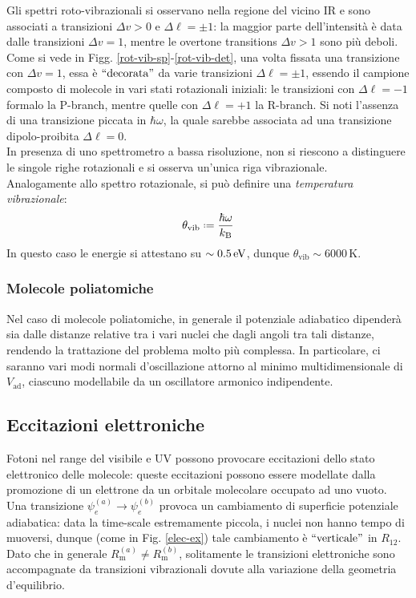 Gli spettri roto-vibrazionali si osservano nella regione del vicino IR e sono associati a transizioni $ \Delta v > 0 $ e $ \Delta \ell = \pm 1 $: la maggior parte dell'intensità è data dalle transizioni $ \Delta v = 1 $, mentre le overtone transitions $ \Delta v > 1 $ sono più deboli. \\
Come si vede in Figg. \ref{rot-vib-sp}-\ref{rot-vib-det}, una volta fissata una transizione con $ \Delta v = 1 $, essa è $ ``\text{decorata}" $ da varie transizioni $ \Delta \ell = \pm 1 $, essendo il campione composto di molecole in vari stati rotazionali iniziali: le transizioni con $ \Delta \ell = -1 $ formalo la P-branch, mentre quelle con $ \Delta \ell = +1 $ la R-branch. Si noti l'assenza di una transizione piccata in $ \hbar \omega $, la quale sarebbe associata ad una transizione dipolo-proibita $ \Delta \ell = 0 $. \\
In presenza di uno spettrometro a bassa risoluzione, non si riescono a distinguere le singole righe rotazionali e si osserva un'unica riga vibrazionale. \\
Analogamente allo spettro rotazionale, si può definire una \textit{temperatura vibrazionale}:
\begin{equation}
	\theta_\text{vib} \defeq \frac{\hbar \omega}{k_\text{B}}
\end{equation}
In questo caso le energie si attestano su $ \sim 0.5\,\mathrm{eV} $, dunque $ \theta_\text{vib} \sim 6000 \,\text{K} $.

\subsubsection{Molecole poliatomiche}

Nel caso di molecole poliatomiche, in generale il potenziale adiabatico dipenderà sia dalle distanze relative tra i vari nuclei che dagli angoli tra tali distanze, rendendo la trattazione del problema molto più complessa. In particolare, ci saranno vari modi normali d'oscillazione attorno al minimo multidimensionale di $ V_\text{ad} $, ciascuno modellabile da un oscillatore armonico indipendente.

\subsection{Eccitazioni elettroniche}

Fotoni nel range del visibile e UV possono provocare eccitazioni dello stato elettronico delle molecole: queste eccitazioni possono essere modellate dalla promozione di un elettrone da un orbitale molecolare occupato ad uno vuoto. Una transizione $ \psi_e^{(a)} \rightarrow \psi_e^{(b)} $ provoca un cambiamento di superficie potenziale adiabatica: data la time-scale estremamente piccola, i nuclei non hanno tempo di muoversi, dunque (come in Fig. \ref{elec-ex}) tale cambiamento è $ ``\text{verticale}" $ in $ R_{12} $. Dato che in generale $ R_\text{m}^{(a)} \neq R_\text{m}^{(b)} $, solitamente le transizioni elettroniche sono accompagnate da transizioni vibrazionali dovute alla variazione della geometria d'equilibrio.

